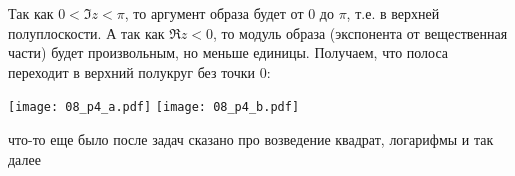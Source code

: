 	Так как $0 < \Im z < \pi$, то аргумент образа будет от $0$ до $\pi$, т.е. в верхней полуплоскости.
	А так как $\Re z < 0$, то модуль образа (экспонента от вещественная части) будет произвольным, но меньше единицы.
	Получаем, что полоса переходит в верхний полукруг без точки 0:
	\begin{center}
		\texttt{[image: 08\_p4\_a.pdf]} \quad \texttt{[image: 08\_p4\_b.pdf]}
	\end{center}

\TODO что-то еще было после задач сказано про возведение квадрат, логарифмы и так далее
